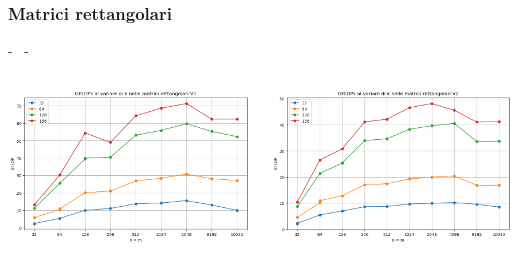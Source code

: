 \documentclass[compress]{beamer}
\begin{document}
\subsubsection*{Matrici rettangolari}
\begin{frame}{\secname \text{ }- \subsecname\ \text{ }- \subsubsecname}
    \begin{columns}
            \begin{minipage}{0.8\textwidth}
                \centering
                \begin{adjustbox}{margin=1cm 0cm 0cm 0cm, center} %
                    \includegraphics[width=1.1\textwidth, frame]{resources/gpu_matrix_rect_perfv1.png}
                \end{adjustbox}
            \end{minipage}
            \begin{minipage}{0.8\textwidth}
                \centering
                \begin{adjustbox}{margin=1.5cm 0cm 0cm 0cm, center} %
                    \includegraphics[width=1.1\textwidth, frame]{resources/gpu_matrix_rect_perfv2.png}

\end{adjustbox}
\end{minipage}
\end{columns}
\end{frame}
\end{document}
